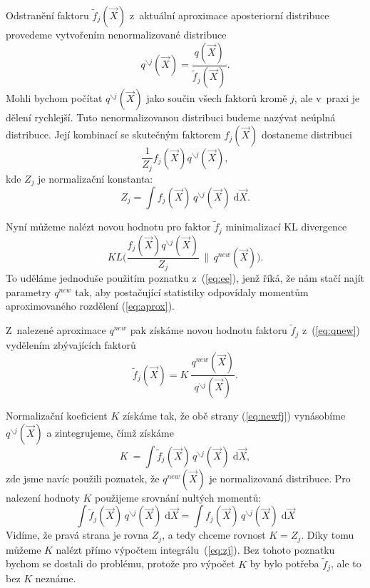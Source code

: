 Odstranění faktoru $\tilde{f}_j(\vec{X})$ z~aktuální aproximace aposteriorní distribuce provedeme vytvořením nenormalizované distribuce
\begin{equation}
q^{\backslash j}(\vec{X}) = \frac{q(\vec{X})}{\tilde{f}_j(\vec{X})}.
\end{equation}
Mohli bychom počítat $q^{\backslash j}(\vec{X})$ jako součin všech faktorů kromě $j$, ale v~praxi je dělení rychlejší.
Tuto nenormalizovanou distribuci budeme nazývat neúplná distribuce.
Její kombinací se skutečným faktorem $f_j(\vec{X})$ dostaneme distribuci
\begin{equation}
    \frac{1}{Z_j} f_j(\vec{X}) q^{\backslash j}(\vec{X}),
\label{eq:aprox}
\end{equation}
kde $Z_j$ je normalizační konstanta:
\begin{equation}
    Z_j = \int f_j(\vec{X}) \, q^{\backslash j}(\vec{X}) \; \mathrm{d}\vec{X}.
\label{eq:zj}
\end{equation}

Nyní můžeme nalézt novou hodnotu pro faktor $\tilde{f}_j$ minimalizací KL divergence
\begin{equation}
    KL\bigg(\frac{f_j(\vec{X}) q^{\backslash j}(\vec{X})}{Z_j} \, \bigg\| \, q^{new}(\vec{X})\bigg).
\end{equation}
To uděláme jednoduše použitím poznatku z~(\ref{eq:ee}), jenž říká, že nám stačí najít parametry $q^{new}$ tak, aby postačující statistiky odpovídaly momentům aproximovaného rozdělení (\ref{eq:aprox}).

Z~nalezené aproximace $q^{new}$ pak získáme novou hodnotu faktoru $\tilde{f}_j$ z~(\ref{eq:qnew}) vydělením zbývajících faktorů
\begin{equation}
    \tilde{f}_j(\vec{X}) = K~\frac{q^{new}(\vec{X})}{q^{\backslash j}(\vec{X})}.
\label{eq:newfj}
\end{equation}

Normalizační koeficient $K$ získáme tak, že obě strany (\ref{eq:newfj}) vynásobíme $q^{\backslash j}(\vec{X})$ a zintegrujeme, čímž získáme
\begin{equation}
    K~= \int \tilde{f}_j(\vec{X}) \, q^{\backslash j}(\vec{X}) \; \mathrm{d}\vec{X},
\end{equation}
zde jsme navíc použili poznatek, že $q^{new}(\vec{X})$ je normalizovaná distribuce.
Pro nalezení hodnoty $K$ použijeme srovnání nultých momentů:
\begin{equation}
    \int \tilde{f}_j (\vec{X}) \, q^{\backslash j}(\vec{X}) \; \mathrm{d}\vec{X} = \int f_j(\vec{X}) \,q^{\backslash j}(\vec{X}) \; \mathrm{d}\vec{X}
\end{equation}
Vidíme, že pravá strana je rovna $Z_j$, a tedy chceme rovnost $K = Z_j$.
Díky tomu můžeme $K$ nalézt přímo výpočtem integrálu~(\ref{eq:zj}).
Bez tohoto poznatku bychom se dostali do problému, protože pro výpočet $K$ by bylo potřeba $\tilde{f}_j$, ale to bez $K$ neznáme.

